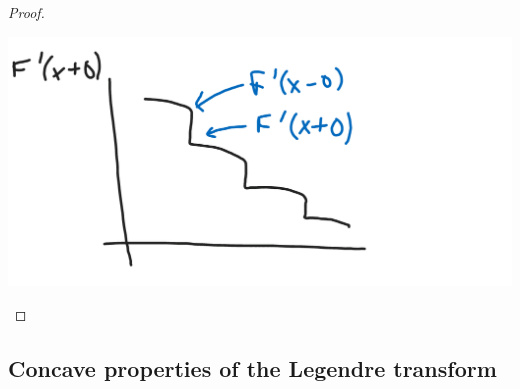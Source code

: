 \documentclass[12pt]{book}
\theoremstyle{norm}
\begin{document}
\begin{proof}
\begin{center}\includegraphics[scale=.25]{images/2-2}\end{center}
\end{proof}

\subsection{Concave properties of the Legendre transform}
\end{document}

